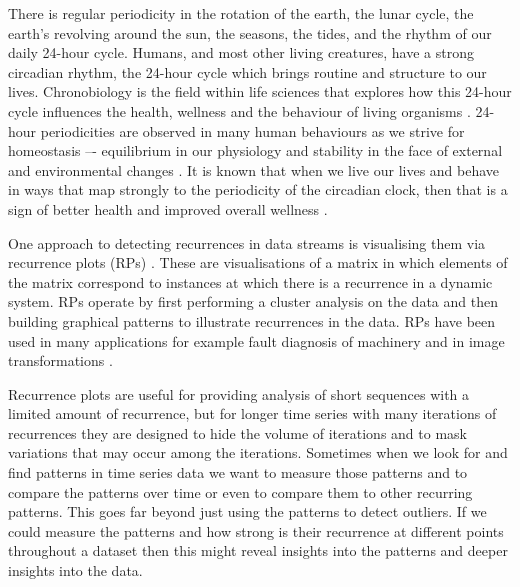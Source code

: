 \documentclass[preprints,article,accept,pdftex,moreauthors]{Definitions/mdpi}
\begin{document}
There is regular periodicity in the rotation of the earth, the lunar cycle, the earth{'s revolving} around the sun, the seasons, the tides, and the rhythm of our daily 24-hour cycle.  
%
Humans, and most other living creatures, have a strong circadian rhythm, the 24-hour cycle which brings routine and structure to our lives.  Chronobiology is the field within life sciences that explores how this 24-hour cycle influences the health, wellness and the behaviour of living organisms \cite{kuhlman2018introduction}. 24-hour periodicities are observed in many human behaviours as we strive for homeostasis –- equilibrium in our physiology and stability in the face of external and environmental changes \cite{cohen2010wellness}.  It is known that when we live our lives and behave in ways that map strongly to the periodicity of the circadian clock, then that is a sign of better health and improved overall wellness \cite{farhud2018circadian}.  



One approach to detecting  recurrences in data streams is visualising them via  recurrence plots (RPs) \cite{marwan2007recurrence}. These are visualisations of a matrix in which elements of the matrix correspond to  instances at which there is a recurrence in a dynamic system.  RPs operate by {first} performing a cluster analysis {on the data} and then building graphical patterns to illustrate  recurrences in the data. {RPs} have been used in many applications for example fault diagnosis of machinery \cite{9427531} and {in} image transformations \cite{a14120349}.

Recurrence plots are useful for providing  analysis  of short sequences with a limited amount of recurrence, but for longer time series with many iterations of recurrences they are designed to hide the volume of iterations and to mask  variations that may occur among {the} iterations.
Sometimes when we look for {and find} patterns in time series data  we want to measure {those} patterns and to compare the patterns over time or {even} to compare them to other recurring patterns{. This goes far beyond  just using} the patterns to detect outliers.
%
If we could measure the patterns and how strong is their recurrence at different points  throughout {a} dataset then this might reveal insights into the patterns and  deeper insights into the data.
\end{document}
